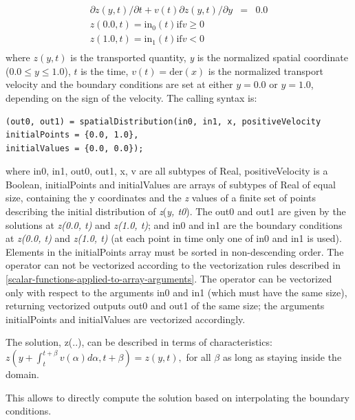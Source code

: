 \documentclass[10pt,a4paper]{report}
\begin{document}
\begin{eqnarray*}
\partial z(y,t)/\partial t+v(t)\partial z(y,t)/\partial y&=&0.0\\
z(0.0, t)=\mathrm{in}_0(t) \mathrm{if} v \ge 0\\
z(1.0, t)=\mathrm{in}_1(t) \mathrm{if} v < 0\\
\end{eqnarray*}
where $z(y, t)$ is the transported quantity, \emph{y} is the
normalized spatial coordinate ($0.0 \le y \le 1.0$), $t$ is the
time, $v(t)=\mathrm{der}(x)$ is the normalized
transport velocity and the boundary conditions are set at either
$y=0.0$ or $y=1.0$, depending on the sign of the velocity.
The calling syntax is:
\begin{lstlisting}[language=modelica]
(out0, out1) = spatialDistribution(in0, in1, x, positiveVelocity
initialPoints = {0.0, 1.0},
initialValues = {0.0, 0.0});
\end{lstlisting}
where in0, in1, out0, out1, x, v are all subtypes of Real,
positiveVelocity is a Boolean, initialPoints and initialValues are
arrays of subtypes of Real of equal size, containing the y coordinates
and the \emph{z} values of a finite set of points describing the initial
distribution of \emph{z}(\emph{y, t0}). The out0 and out1 are given by
the solutions at \emph{z(0.0, t)} and \emph{z(1.0, t)}; and in0 and in1
are the boundary conditions at \emph{z(0.0, t)} and \emph{z(1.0, t)} (at
each point in time only one of in0 and in1 is used). Elements in the
initialPoints array must be sorted in non-descending order. The operator
can not be vectorized according to the vectorization rules described in
\ref{scalar-functions-applied-to-array-arguments}. The operator can be vectorized only with respect to the
arguments in0 and in1 (which must have the same size), returning
vectorized outputs out0 and out1 of the same size; the arguments
initialPoints and initialValues are vectorized accordingly.

The solution, z(..), can be described in terms of characteristics:
$z(y+\int_t^{t+\beta}v(\alpha)d\alpha,t+\beta)=z(y,t),$ for all $\beta$ as long as staying inside the domain.

This allows to directly compute the solution based on interpolating the
boundary conditions.
\end{document}
